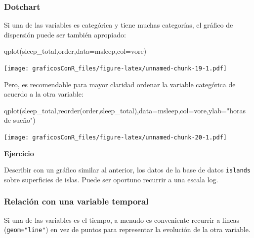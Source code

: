 \documentclass[
]{article}
\newenvironment{Shaded}{\begin{snugshade}}{\end{snugshade}}
\newcommand{\AttributeTok}[1]{\textcolor[rgb]{0.77,0.63,0.00}{#1}}
\newcommand{\FunctionTok}[1]{\textcolor[rgb]{0.00,0.00,0.00}{#1}}
\newcommand{\NormalTok}[1]{#1}
\newcommand{\StringTok}[1]{\textcolor[rgb]{0.31,0.60,0.02}{#1}}
\newcounter{ejcnt}[section]
\numberwithin{ejcnt}{section}
\newenvironment{ej}[1][]{%
	\refstepcounter{ejcnt}%
	\par\medskip%
	\noindent%
	\textbf{Ejercicio \theejcnt \;\;}%
	\rmfamily%
}{\medskip}
\begin{document}
\hypertarget{dotchart}{%
\subsubsection{Dotchart}\label{dotchart}}

Si una de las variables es categórica y tiene muchas categorías, el gráfico de dispersión puede ser también apropiado:

\begin{Shaded}
\begin{Highlighting}[]
\FunctionTok{qplot}\NormalTok{(sleep\_total,order,}\AttributeTok{data=}\NormalTok{msleep,}\AttributeTok{col=}\NormalTok{vore) }
\end{Highlighting}
\end{Shaded}

\texttt{[image: graficosConR\_files/figure-latex/unnamed-chunk-19-1.pdf]}

Pero, es recomendable para mayor claridad ordenar la variable categórica de acuerdo a la otra variable:

\begin{Shaded}
\begin{Highlighting}[]
\FunctionTok{qplot}\NormalTok{(sleep\_total,}\FunctionTok{reorder}\NormalTok{(order,sleep\_total),}\AttributeTok{data=}\NormalTok{msleep,}\AttributeTok{col=}\NormalTok{vore,}\AttributeTok{ylab=}\StringTok{"horas de sueño"}\NormalTok{)}
\end{Highlighting}
\end{Shaded}

\texttt{[image: graficosConR\_files/figure-latex/unnamed-chunk-20-1.pdf]}

\begin{ej}
Describir con un gráfico similar al anterior, los datos de la base de
datos \texttt{islands} sobre superficies de islas. Puede ser oportuno
recurrir a una escala log.
\end{ej}

\hypertarget{relaciuxf3n-con-una-variable-temporal}{%
\subsubsection{Relación con una variable temporal}\label{relaciuxf3n-con-una-variable-temporal}}

Si una de las variables es el tiempo, a menudo es conveniente recurrir a lineas (\texttt{geom="line"}) en vez de puntos para representar la evolución de la otra variable.
\end{document}
